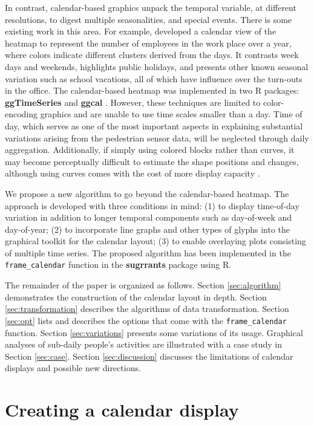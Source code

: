 \documentclass[12pt]{article}
\begin{document}
In contrast, calendar-based graphics unpack the temporal variable, at
different resolutions, to digest multiple seasonalities, and special
events. There is some existing work in this area. For example,
\citet{VanWijkCluster1999} developed a calendar view of the heatmap to
represent the number of employees in the work place over a year, where
colors indicate different clusters derived from the days. It contrasts
week days and weekends, highlights public holidays, and presents other
known seasonal variation such as school vacations, all of which have
influence over the turn-outs in the office. The calendar-based heatmap
was implemented in two R packages: \textbf{ggTimeSeries}
\citep{R-ggTimeSeries} and \textbf{ggcal} \citep{R-ggcal}. However,
these techniques are limited to color-encoding graphics and are unable
to use time scales smaller than a day. Time of day, which serves as one
of the most important aspects in explaining substantial variations
arising from the pedestrian sensor data, will be neglected through daily
aggregation. Additionally, if simply using colored blocks rather than
curves, it may become perceptually difficult to estimate the shape
positions and changes, although using curves comes with the cost of more
display capacity \citep{cleveland1984graphical, lam2007overview}.

We propose a new algorithm to go beyond the calendar-based heatmap. The
approach is developed with three conditions in mind: (1) to display
time-of-day variation in addition to longer temporal components such as
day-of-week and day-of-year; (2) to incorporate line graphs and other
types of glyphs into the graphical toolkit for the calendar layout; (3)
to enable overlaying plots consisting of multiple time series. The
proposed algorithm has been implemented in the \texttt{frame\_calendar}
function in the \textbf{sugrrants} package using R.

The remainder of the paper is organized as follows. Section
\ref{sec:algorithm} demonstrates the construction of the calendar layout
in depth. Section \ref{sec:transformation} describes the algorithms of
data transformation. Section \ref{sec:opt} lists and describes the
options that come with the \texttt{frame\_calendar} function. Section
\ref{sec:variations} presents some variations of its usage. Graphical
analyses of sub-daily people's activities are illustrated with a case
study in Section \ref{sec:case}. Section \ref{sec:discussion} discusses
the limitations of calendar displays and possible new directions.

\hypertarget{creating-a-calendar-display}{%
\section{Creating a calendar
display}\label{creating-a-calendar-display}}
\end{document}
